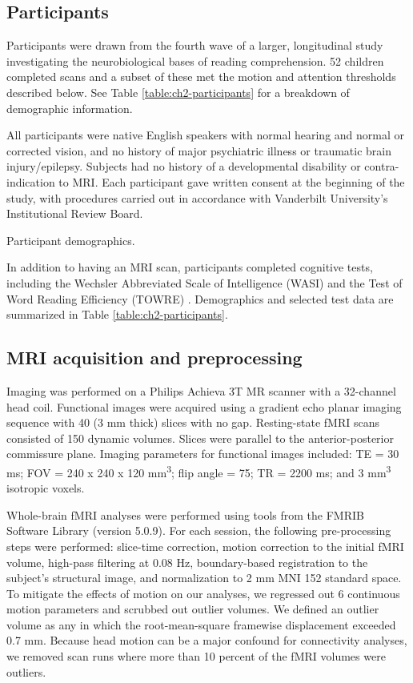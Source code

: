 \subsection{Participants}

Participants were drawn from the fourth wave of a larger, longitudinal study investigating the neurobiological bases of reading comprehension. 52 children completed scans and a subset of these met the motion and attention thresholds described below. See Table \ref{table:ch2-participants} for a breakdown of demographic information. 

All participants were native English speakers with normal hearing and normal or corrected vision, and no history of major psychiatric illness or traumatic brain injury/epilepsy. Subjects had no history of a developmental disability or contra-indication to MRI.  Each participant gave written consent at the beginning of the study, with procedures carried out in accordance with Vanderbilt University’s Institutional Review Board.

\begin{table}
    \renewcommand{\tabcolsep}{0.09cm}
    \centering
    
    \caption{Participant demographics.}
    \label{table:ch2-participants}
\end{table}

In addition to having an MRI scan, participants completed cognitive tests, including the Wechsler Abbreviated Scale of Intelligence (WASI) \citep{Kaplan1999} and the Test of Word Reading Efficiency (TOWRE) \citep{Torgesen2012}. Demographics and selected test data are summarized in Table \ref{table:ch2-participants}. 

\subsection{MRI acquisition and preprocessing}

Imaging was performed on a Philips Achieva 3T MR scanner with a 32-channel head coil. Functional images were acquired using a gradient echo planar imaging sequence with 40 (3 mm thick) slices with no gap. Resting-state fMRI scans consisted of 150 dynamic volumes. Slices were parallel to the anterior-posterior commissure plane. Imaging parameters for functional images included: TE = 30 ms; FOV = 240 x 240 x 120 mm\textsuperscript{3}; flip angle = 75\degree; TR = 2200 ms; and 3 mm\textsuperscript{3} isotropic voxels.

Whole-brain fMRI analyses were performed using tools from the FMRIB Software Library (version 5.0.9). For each session, the following pre-processing steps were performed:  slice-time correction, motion correction to the initial fMRI volume, high-pass filtering at 0.08 Hz, boundary-based registration to the subject's structural image, and normalization to 2 mm MNI 152 standard space. To mitigate the effects of motion on our analyses, we regressed out 6 continuous motion parameters and scrubbed out outlier volumes. We defined an outlier volume as any in which the root-mean-square framewise displacement exceeded 0.7 mm. Because head motion can be a major confound for connectivity analyses, we removed scan runs where more than 10 percent of the fMRI volumes were outliers.


